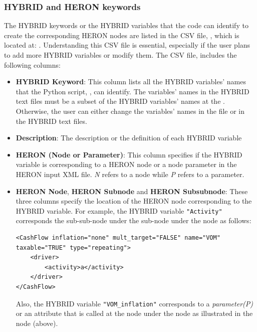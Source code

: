 \subsubsection{HYBRID and HERON keywords}
The HYBRID keywords or the HYBRID variables that the  code can identify to create the corresponding HERON nodes are listed in the CSV file, , which is located at: . Understanding this CSV file is essential, especially if the user plans to add more HYBRID variables or modify them. The CSV file,  includes the following columns:


\begin{itemize}
    \item \textbf{HYBRID Keyword}: This column lists all the HYBRID variables' names that the Python script, , can identify. The variables' names in the HYBRID text files must be a subset of the HYBRID variables' names at the . Otherwise, the user can either change the variables' names in the  file or in the HYBRID text files.
    \item \textbf{Description}: The description or the definition of each HYBRID variable
    \item \textbf{HERON (Node or Parameter)}: This column specifies if the HYBRID variable is corresponding to a HERON node or a node parameter in the HERON input XML file. \emph{N} refers to a node while \emph{P} refers to a parameter.
    \item \textbf{HERON Node}, \textbf{HERON Subnode} and \textbf{HERON Subsubnode}: These three columns specify the location of the HERON node corresponding to the HYBRID variable. For example, the HYBRID variable \verb|"Activity"| corresponds the sub-sub-node  under the  sub-node under the  node as follows:

    \begin{lstlisting}[style=XML,morekeywords={class}]
<CashFlow inflation="none" mult_target="FALSE" name="VOM" taxable="TRUE" type="repeating">
    <driver>
        <activity>a</activity>
    </driver>
</CashFlow>

    \end{lstlisting}
          Also, the HYBRID variable \verb|"VOM_inflation"| corresponds to a \emph{parameter(P)} or an attribute that is called  at the node  under the  node as illustrated in the  node (above).


\end{itemize}
